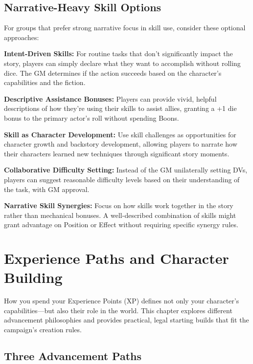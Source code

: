 \documentclass[11pt,twoside,openany]{book}
\begin{document}
\section*{Narrative-Heavy Skill Options} 

For groups that prefer strong narrative focus in skill use, consider these optional approaches:

\textbf{Intent-Driven Skills:} For routine tasks that don't significantly impact the story, players can simply declare what they want to accomplish without rolling dice. The GM determines if the action succeeds based on the character's capabilities and the fiction.

\textbf{Descriptive Assistance Bonuses:} Players can provide vivid, helpful descriptions of how they're using their skills to assist allies, granting a +1 die bonus to the primary actor's roll without spending Boons.

\textbf{Skill as Character Development:} Use skill challenges as opportunities for character growth and backstory development, allowing players to narrate how their characters learned new techniques through significant story moments.

\textbf{Collaborative Difficulty Setting:} Instead of the GM unilaterally setting DVs, players can suggest reasonable difficulty levels based on their understanding of the task, with GM approval.

\textbf{Narrative Skill Synergies:} Focus on how skills work together in the story rather than mechanical bonuses. A well-described combination of skills might grant advantage on Position or Effect without requiring specific synergy rules.

\chapter{Experience Paths and Character Building} \label{ch:paths}

How you spend your Experience Points (XP) defines not only your character's capabilities—but also their role in the world. This chapter explores different advancement philosophies and provides practical, legal starting builds that fit the campaign's creation rules.

\section*{Three Advancement Paths} 
\end{document}
